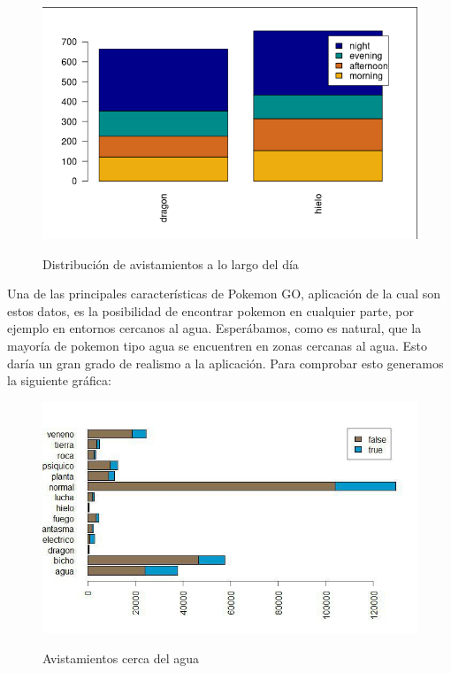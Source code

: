 \begin{figure}[H] %
\centering
\includegraphics[scale=0.8]{img/noche3.png}  %
\label{img/noche3.jpg}
\caption{Distribución de avistamientos a lo largo del día}
\end{figure}

Una de las principales características de Pokemon GO, aplicación de la cual son estos datos, es la posibilidad de encontrar pokemon en cualquier parte, por ejemplo en entornos cercanos al agua. Esperábamos, como es natural, que la mayoría de pokemon tipo agua se encuentren en zonas cercanas al agua. Esto daría un gran grado de realismo a la aplicación. Para comprobar esto generamos la siguiente gráfica:

\begin{figure}[H] %
\centering
\includegraphics[scale=0.8]{img/cercaagua.jpg}  %
\label{img/cercaagua.jpg}
\caption{Avistamientos cerca del agua}
\end{figure}

